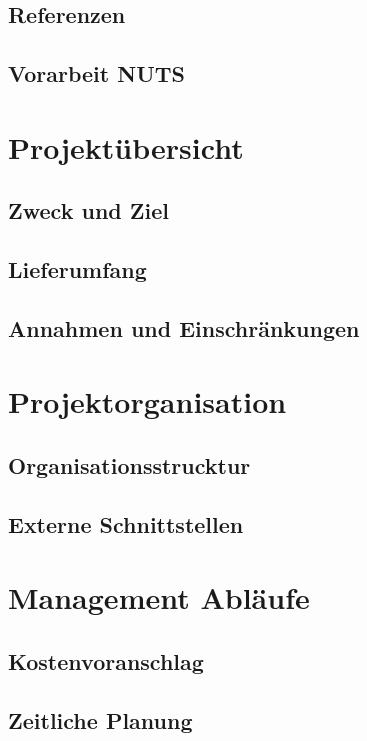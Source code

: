 \documentclass[
	ngerman,
	toc=listof, %
	toc=bibliography, %
	footnotes=multiple, %
	parskip=half, %
	numbers=noendperiod %
]{scrartcl}
\begin{document}
	\subsection{Referenzen}

	\subsection{Vorarbeit NUTS}

\section{Projektübersicht}
	\subsection{Zweck und Ziel}

	\subsection{Lieferumfang}
	
	\subsection{Annahmen und Einschränkungen}

\section{Projektorganisation}
	\subsection{Organisationsstrucktur}

	\subsection{Externe Schnittstellen}

\section{Management Abläufe}
	\subsection{Kostenvoranschlag}

	\subsection{Zeitliche Planung}
\end{document}
